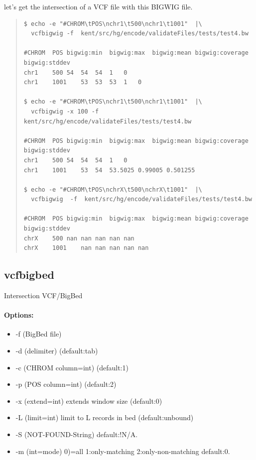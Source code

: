 \documentclass[12pt]{article}
\begin{document}
let's get the intersection of a VCF file with this BIGWIG file.

\begin{quote}
\begin{verbatim}
$ echo -e "#CHROM\tPOS\nchr1\t500\nchr1\t1001"  |\
  vcfbigwig -f  kent/src/hg/encode/validateFiles/tests/test4.bw
  
#CHROM	POS	bigwig:min	bigwig:max	bigwig:mean	bigwig:coverage	bigwig:stddev
chr1	500	54	54	54	1	0
chr1	1001	53	53	53	1	0

$ echo -e "#CHROM\tPOS\nchr1\t500\nchr1\t1001"  |\
  vcfbigwig -x 100 -f  kent/src/hg/encode/validateFiles/tests/test4.bw
  
#CHROM	POS	bigwig:min	bigwig:max	bigwig:mean	bigwig:coverage	bigwig:stddev
chr1	500	54	54	54	1	0
chr1	1001	53	54	53.5025	0.99005	0.501255

$ echo -e "#CHROM\tPOS\nchrX\t500\nchrX\t1001"  |\
  vcfbigwig  -f  kent/src/hg/encode/validateFiles/tests/test4.bw
  
#CHROM	POS	bigwig:min	bigwig:max	bigwig:mean	bigwig:coverage	bigwig:stddev
chrX	500	nan	nan	nan	nan	nan
chrX	1001	nan	nan	nan	nan	nan
\end{verbatim}
\end{quote}

\subsection{vcfbigbed}
Intersection VCF/BigBed
\paragraph{Options:}
\begin{itemize}
\item-f (BigBed file)
\item-d (delimiter) (default:tab)
\item-c (CHROM column=int) (default:1)
\item-p (POS column=int) (default:2)
\item-x (extend=int) extends window size (default:0)
\item-L (limit=int) limit to L records in bed (default:unbound)
\item-S (NOT-FOUND-String) default:!N/A.
\item-m  (int=mode) 0)=all 1:only-matching  2:only-non-matching default:0.
\end{itemize}
\end{document}
